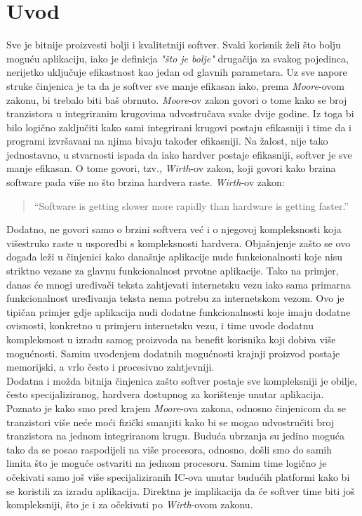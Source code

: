 \chapter{Uvod}

Sve je bitnije proizvesti bolji i kvalitetniji softver. Svaki korisnik želi što bolju moguću aplikaciju, iako je definicja \textit{"što je bolje"} drugačija za svakog pojedinca, nerijetko uključuje efikastnost kao jedan od glavnih parametara. Uz sve napore struke činjenica je ta da je softver sve manje efikasan iako, prema \textit{Moore}-ovom zakonu\cite{mooresLaw}, bi trebalo biti baš obrnuto. \textit{Moore}-ov zakon govori o tome kako se broj tranzistora u integriranim krugovima udvostručava svake dvije godine. Iz toga bi bilo logično zaključiti kako sami integrirani krugovi postaju efikasniji i time da i programi izvršavani na njima bivaju također efikasniji. Na žalost, nije tako jednostavno, u stvarnosti ispada da iako hardver postaje efikasniji, softver je sve manje efikasan. O tome govori, tzv., \textit{Wirth}-ov zakon, koji govori kako brzina software pada više no što brzina hardvera raste. \textit{Wirth}-ov zakon:
\begin{quote}
    ``Software is getting slower more rapidly than hardware is getting faster.''\cite{wirthsLaw}
\end{quote}
Dodatno, ne govori samo o brzini softvera već i o njegovoj kompleksnosti koja višestruko raste u usporedbi s kompleksnosti hardvera. Objašnjenje zašto se ovo događa leži u činjenici kako današnje aplikacije nude funkcionalnosti koje nisu striktno vezane za glavnu funkcionalnost prvotne aplikacije. Tako na primjer, danas će mnogi uređivači teksta zahtjevati internetsku vezu iako sama primarna funkcionalnost uređivanja teksta nema potrebu za internetskom vezom. Ovo je tipičan primjer gdje aplikacija nudi dodatne funkcionalnosti koje imaju dodatne ovisnosti, konkretno u primjeru internetsku vezu, i time uvode dodatnu kompleksnost u izradu samog proizvoda na benefit korisnika koji dobiva više mogućnosti. Samim uvođenjem dodatnih mogućnosti krajnji proizvod postaje memorijski, a vrlo često i procesivno zahtjevniji. \\ 

Dodatna i možda bitnija činjenica zašto softver postaje sve kompleksniji je obilje, često specijaliziranog, hardvera dostupnog za korištenje unutar aplikacija. Poznato je kako smo pred krajem \textit{Moore}-ova zakona, odnosno činjenicom da se tranzistori više neće moći fizički smanjiti kako bi se mogao udvostručiti broj tranzistora na jednom integriranom krugu. Buduća ubrzanja su jedino moguća tako da se posao raspodijeli na više procesora, odnosno, došli smo do samih limita što je moguće ostvariti na jednom procesoru. Samim time logično je očekivati samo još više specijaliziranih IC-ova unutar budućih platformi kako bi se koristili za izradu aplikacija. Direktna je implikacija da će softver time biti još kompleksniji, što je i za očekivati po \textit{Wirth}-ovom zakonu. \\ 

